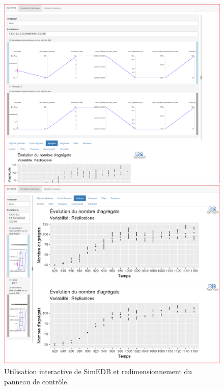 \begin{figure}[H]
\begin{minipage}[t]{.49\linewidth}
				\end{minipage} \hfill
				\begin{minipage}[b]{.49\linewidth}
					\centering
					\vspace{0pt}
					\includegraphics[width=\linewidth]{img/SimEDB_selection.png}
				\end{minipage} \hfill
				\begin{minipage}[b]{.49\linewidth}
					\centering
					\vspace{0pt}
					\includegraphics[width=\linewidth]{img/SimEDB_indicateur_grand_magnified.png}
				\end{minipage}
			\caption{Utilisation interactive de SimEDB et redimensionnement du panneau de contrôle.}
			\label{fig:resizing}
			\end{figure}
			
